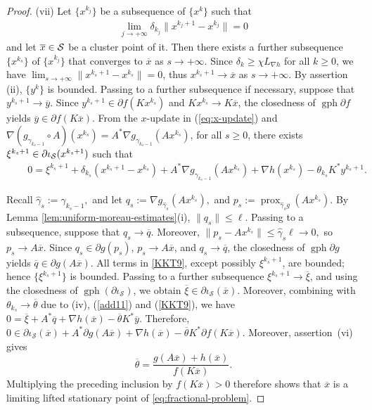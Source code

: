 \documentclass[11pt]{article}
\numberwithin{equation}{section}
\newcommand{\prox}{\operatorname{prox}}
\begin{document}
\begin{proof}
\textup{(vii)}
Let \(\{{ x}^{k_j}\}\) be a subsequence of $\{ x^k\}$ such that
\begin{eqnarray}\label{add11}
\lim\limits_{j \to +\infty} \delta_{k_j} \|{ x}^{k_j+1} - { x}^{k_j}\| = 0
 \end{eqnarray}
 and let $\overline{ x} \in {\cal S}$ be a cluster point of it. Then there exists a further subsequence $\{{ x}^{k_s}\}$ of $\{{ x}^{k_j}\}$ that converges to ${\overline{ x}}$ as $s \to +\infty$. Since $\delta_k\ge\chi L_{\nabla h}$ for all $k \geq 0$, we have $\lim_{s\to+\infty}\|{ x}^{k_s+1}-{ x}^{k_s}\|=0$, thus ${ x}^{k_s+1} \rightarrow \overline { x}$ as $s \to +\infty$.
By assertion (ii), $\{y^k\}$ is bounded. Passing to a further
subsequence if necessary, suppose that
$y^{k_s+1}\to\overline y$. Since
$y^{k_s+1}\in\partial f(Kx^{k_s})$ and
$Kx^{k_s}\to K\overline x$, the closedness of
$\operatorname{gph}\partial f$ yields
$\overline y\in\partial f(K\overline x)$.
From  the $ x$-update in (\ref{eq:x-update}) and $\nabla(g_{\gamma_{k_s-1}} \circ A)({x}^{k_s})=A^* \nabla g_{\gamma_{k_s-1}}(A {x}^{k_s})$, for all $s \geq 0$, there exists ${ \xi}^{k_s+1} \in \partial \iota_{\cal S}({ x}^{k_s+1})$ such that
\begin{eqnarray}\label{KKT9}
\ \ \ \ \ \ \ \ 0 = { \xi}^{k_s+1}  +\delta_{k_s}({ x}^{k_s+1}-{ x}^{k_s}) + A^*\nabla g_{\gamma_{k_s-1}}(A{ x}^{k_s}) + \nabla h({ x}^{k_s})  - \theta_{k_s} K^* { y}^{k_s+1}.
\end{eqnarray}

Recall
$\widehat \gamma_s:=\gamma_{k_s-1},$  and let $q_s:=\nabla g_{\widehat\gamma_s}(Ax^{k_s}),$ and $p_s:=\prox_{\widehat\gamma_s g}(Ax^{k_s}).$
By  Lemma \ref{lem:uniform-moreau-estimates}(i), $\|q_s\|\leq\ell$. Passing to a
subsequence, suppose that $q_s\to\overline q$. Moreover,
$
\|p_s-Ax^{k_s}\|
\leq\widehat\gamma_s\ell\longrightarrow0,
$
so $p_s\to A {\overline x}$. Since \(q_s\in\partial g(p_s)\), \(p_s\to A{\overline x}\), and \(q_s\to \overline{q}\),
the closedness of \(\operatorname{gph}\partial g\) yields
\(\overline q\in\partial g(A\overline{x})\).
All terms in \eqref{KKT9}, except possibly
$\xi^{k_s+1}$, are bounded; hence $\{\xi^{k_s+1}\}$ is bounded. Passing
to a further subsequence $\xi^{k_s+1}\to \overline \xi$, and using the closedness of
$\operatorname{gph}(\partial\iota_{\mathcal S})$, we obtain
$\overline\xi\in\partial\iota_{\mathcal S}(\overline x)$.
Moreover, combining with $\theta_{k_s}\to\overline \theta$ due to (iv), (\ref{add11}) and (\ref{KKT9}), we have
$
0=\overline\xi+A^*\overline q+\nabla h(\overline x)
-\overline\theta K^*\overline y.
$
Therefore,
$
0\in\partial\iota_{\mathcal S}(\overline x)
+A^*\partial g(A\overline x)+\nabla h(\overline x)
-\overline\theta K^*\partial f(K\overline x).
$
Moreover, assertion~\textup{(vi)} gives
\[
    \overline\theta=\frac{g(A\overline x)+h(\overline x)}{f(K\overline x)}.
\]
Multiplying the preceding inclusion by \(f(K\overline x)>0\) therefore shows
that \(\overline x\) is a limiting lifted stationary point of
\eqref{eq:fractional-problem}.
\end{proof}
\end{document}
